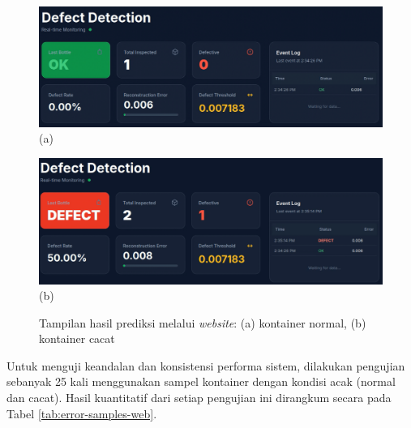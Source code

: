 \begin{figure}[H]
  \centering
  \begin{minipage}{\textwidth}
    \centering
    \includegraphics[width=\textwidth]{gambar/web_ss_normal.png}
    (a)
  \end{minipage}
  \vspace{1em}

  \begin{minipage}{\textwidth}
    \centering
    \includegraphics[width=\textwidth]{gambar/web_ss_cacat.png}
    (b)
  \end{minipage}
  \centering
  \caption{Tampilan hasil prediksi melalui \textit{website}: (a)
  kontainer normal, (b) kontainer cacat}
  \label{fig:web-test}
  \vspace{-1em}
\end{figure}

Untuk menguji keandalan dan konsistensi performa sistem, dilakukan
pengujian sebanyak 25 kali menggunakan sampel kontainer dengan
kondisi acak (normal dan cacat). Hasil kuantitatif dari setiap
pengujian ini dirangkum secara pada Tabel \ref{tab:error-samples-web}.

